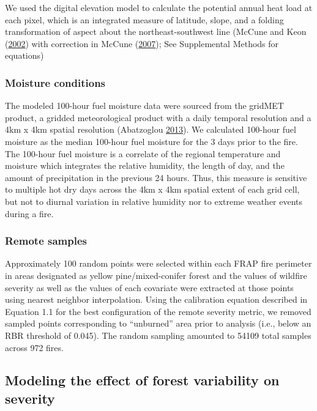 \documentclass[twoside,12pt,final]{ucthesis-CA2012}
\begin{document}
\begin{ucmainmatter}
We used the digital elevation model to calculate the potential annual
heat load at each pixel, which is an integrated measure of latitude,
slope, and a folding transformation of aspect about the
northeast-southwest line (McCune and Keon
(\protect\hyperlink{ref-mccune2002}{2002}) with correction in McCune
(\protect\hyperlink{ref-mccune2007}{2007}); See Supplemental Methods for
equations)

\subsubsection{Moisture conditions}\label{moisture-conditions}

The modeled 100-hour fuel moisture data were sourced from the gridMET
product, a gridded meteorological product with a daily temporal
resolution and a 4km x 4km spatial resolution (Abatzoglou
\protect\hyperlink{ref-abatzoglou2013}{2013}). We calculated 100-hour
fuel moisture as the median 100-hour fuel moisture for the 3 days prior
to the fire. The 100-hour fuel moisture is a correlate of the regional
temperature and moisture which integrates the relative humidity, the
length of day, and the amount of precipitation in the previous 24 hours.
Thus, this measure is sensitive to multiple hot dry days across the 4km
x 4km spatial extent of each grid cell, but not to diurnal variation in
relative humidity nor to extreme weather events during a fire.

\subsubsection{Remote samples}\label{remote-samples}

Approximately 100 random points were selected within each FRAP fire
perimeter in areas designated as yellow pine/mixed-conifer forest and
the values of wildfire severity as well as the values of each covariate
were extracted at those points using nearest neighbor interpolation.
Using the calibration equation described in Equation 1.1 for the best
configuration of the remote severity metric, we removed sampled points
corresponding to ``unburned'' area prior to analysis (i.e., below an RBR
threshold of 0.045). The random sampling amounted to 54109 total samples
across 972 fires.

\subsection{Modeling the effect of forest variability on
severity}\label{modeling-the-effect-of-forest-variability-on-severity}


\end{ucmainmatter}
\end{document}
